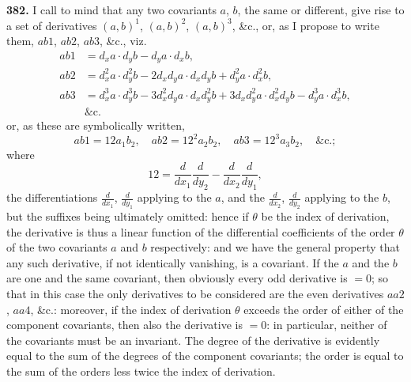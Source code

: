 \documentclass[12pt,a4paper]{article}
\begin{document}
\noindent\textbf{382.} I call to mind that any two covariants $a$, $b$, the same or different, give rise to a set of derivatives $(a, b)^1$, $(a, b)^2$, $(a, b)^3$, \&c., or, as I propose to write them, $ab1$, $ab2$, $ab3$, \&c., viz.
\begin{align*}
ab1 &= d_x a \cdot d_y b - d_y a \cdot d_x b, \\
ab2 &= d_x^2 a \cdot d_y^2 b - 2d_x d_y a \cdot d_x d_y b + d_y^2 a \cdot d_x^2 b, \\
ab3 &= d_x^3 a \cdot d_y^3 b - 3d_x^2 d_y a \cdot d_x d_y^2 b + 3d_x d_y^2 a \cdot d_x^2 d_y b - d_y^3 a \cdot d_x^3 b, \\
&\text{\&c.}
\end{align*}
or, as these are symbolically written,
\[
ab1 = 12a_1 b_2,\quad ab2 = 12^2 a_2 b_2,\quad ab3 = 12^3 a_3 b_2,\quad \text{\&c.};
\]
where
\[
12 = \frac{d}{dx_1} \frac{d}{dy_2} - \frac{d}{dx_2} \frac{d}{dy_1},
\]
the differentiations $\frac{d}{dx_1}$, $\frac{d}{dy_1}$ applying to the $a$, and the $\frac{d}{dx_2}$, $\frac{d}{dy_2}$ applying to the $b$, but the suffixes being ultimately omitted: hence if $\theta$ be the index of derivation, the derivative is thus a linear function of the differential coefficients of the order $\theta$ of the two covariants $a$ and $b$ respectively: and we have the general property that any such derivative, if not identically vanishing, is a covariant. If the $a$ and the $b$ are one and the same covariant, then obviously every odd derivative is $=0$; so that in this case the only derivatives to be considered are the even derivatives $aa2$, $aa4$, \&c.: moreover, if the index of derivation $\theta$ exceeds the order of either of the component covariants, then also the derivative is $=0$: in particular, neither of the covariants must be an invariant. The degree of the derivative is evidently equal to the sum of the degrees of the component covariants; the order is equal to the sum of the orders less twice the index of derivation.

\medskip
\end{document}
